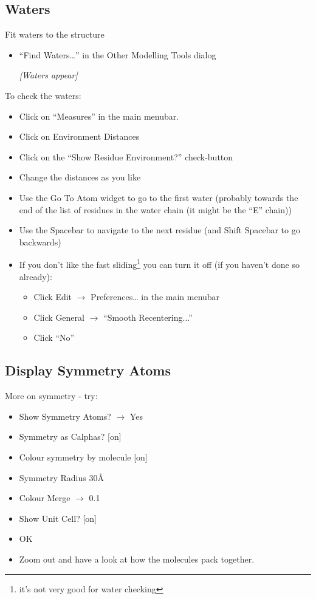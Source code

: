 \documentclass{article}
\begin{document}
\subsection{Waters}
Fit waters to the structure
\begin{itemize}
\item \textsf{``Find Waters\ldots''} in the Other Modelling Tools dialog

\textsl{ [Waters appear]}

\end{itemize}
To check the waters:
\begin{itemize}
\item Click on \textsf{``Measures''} in the main menubar.
\item Click on \textsf{Environment Distances}
\item Click on the \textsf{``Show Residue Environment?''} check-button
\item Change the distances as you like
\item Use the \textsf{Go To Atom} widget to go to the first water (probably
  towards the end of the list of residues in the water chain (it might be the ``E'' chain))
\item Use the Spacebar to navigate to the next residue (and Shift
  Spacebar to go backwards)
\item If you don't like the fast sliding\footnote{it's not very good
    for water checking} you can turn it off (if you haven't done so already):
  \begin{itemize}
  \item Click \textsf{Edit $\rightarrow$ Preferences\ldots} in the main menubar
  \item Click \textsf{General $\rightarrow$ ``Smooth Recentering...''}
  \item Click \textsf{``No''}
  \end{itemize}
\end{itemize}

\subsection{Display Symmetry Atoms}

More on symmetry - try:
\begin{itemize}
\item \textsf{Show Symmetry Atoms? $\rightarrow$ Yes}
\item \textsf{Symmetry as Calphas?} [on]
\item \textsf{Colour symmetry by molecule} [on]
\item \textsf{Symmetry Radius 30\AA}
\item \textsf{Colour Merge $\rightarrow$ 0.1}
\item \textsf{Show Unit Cell?} [on]
\item \textsf{OK}
\item Zoom out and have a look at how the molecules pack together.
\end{itemize}
\end{document}
